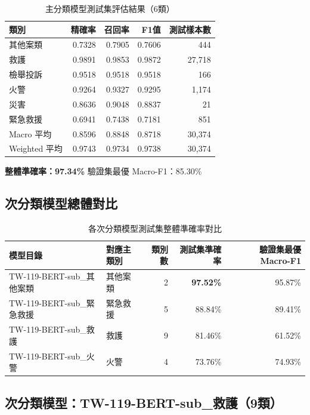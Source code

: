 \documentclass[UTF8,a4paper,11pt]{ctexart}
\begin{document}
\begin{table}[htbp]
  \centering
  \caption{主分類模型測試集評估結果（6類）}
  \label{tab:main-results}
  \begin{tabular}{lrrrr}
    \toprule
    類別 & 精確率 & 召回率 & F1值 & 測試樣本數 \\
    \midrule
    其他案類   & 0.7328 & 0.7905 & 0.7606 &    444 \\
    救護       & 0.9891 & 0.9853 & 0.9872 & 27,718 \\
    檢舉投訴   & 0.9518 & 0.9518 & 0.9518 &    166 \\
    火警       & 0.9264 & 0.9327 & 0.9295 &  1,174 \\
    災害       & 0.8636 & 0.9048 & 0.8837 &     21 \\
    緊急救援   & 0.6941 & 0.7438 & 0.7181 &    851 \\
    \midrule
    Macro 平均 & 0.8596 & 0.8848 & 0.8718 & 30,374 \\
    Weighted 平均 & 0.9743 & 0.9734 & 0.9738 & 30,374 \\
  \end{tabular}
\end{table}

\noindent\textbf{整體準確率：97.34\%} \quad 驗證集最優 Macro-F1：85.30\%

\subsection{次分類模型總體對比}

\begin{table}[htbp]
  \centering
  \caption{各次分類模型測試集整體準確率對比}
  \label{tab:sub-summary}
  \begin{tabular}{llrrr}
    \toprule
    模型目錄 & 對應主類別 & 類別數 & 測試集準確率 & 驗證集最優 Macro-F1 \\
    \midrule
    TW-119-BERT-sub\_其他案類   & 其他案類   & 2 & \textbf{97.52\%} & 95.87\% \\
    TW-119-BERT-sub\_緊急救援   & 緊急救援   & 5 & 88.84\% & 89.41\% \\
    TW-119-BERT-sub\_救護       & 救護       & 9 & 81.46\% & 61.52\% \\
    TW-119-BERT-sub\_火警       & 火警       & 4 & 73.76\% & 74.93\% \\
    \bottomrule
  \end{tabular}
\end{table}

\subsection{次分類模型：TW-119-BERT-sub\_救護（9類）}
\end{document}
